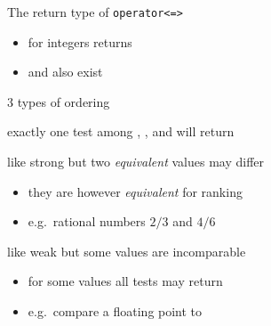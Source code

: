 \begin{frame}[fragile]
  \begin{block}{The return type of \texttt{operator<=>}}
    \begin{itemize}
    \item for integers  returns 
    \item {} and  also exist
    \end{itemize}
  \end{block}
  \begin{exampleblock}{3 types of ordering}
    \begin{description}[partial]
    \item[strong] exactly one test among , , and  will return 
    \item[weak] like strong but two \emph{equivalent} values may differ
      \begin{itemize}
      \item they are however \emph{equivalent} for ranking
      \item e.g.\ rational numbers $2/3$ and $4/6$
      \end{itemize}
    \item[partial] like weak but some values are incomparable
      \begin{itemize}
      \item for some values all tests may return 
      \item e.g.\ compare a floating point to 
      \end{itemize}
    \end{description}
  \end{exampleblock}
\end{frame}


